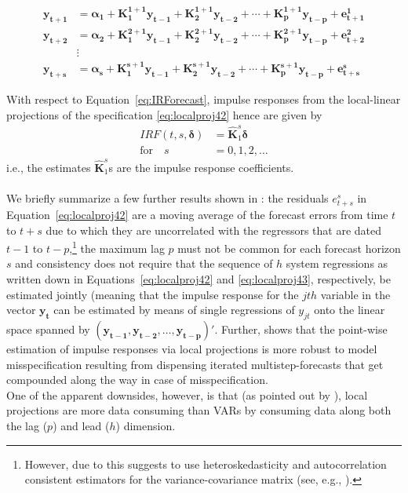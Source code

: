 \documentclass[a4paper,11pt,listof=nochaptergap,oneside,pointednumbers,bibtotoc,bigheadings,liststotoc]{scrbook}
\theoremstyle{mysatz}
\theoremstyle{mydefinition}
\theoremstyle{mybemerkung}
\let\oldhat\hat
\newcommand{\vect}[1]{\boldsymbol{\mathbf{#1}}}
\newcommand{\hatt}[1]{\oldhat{\boldsymbol{\mathbf{#1}}}}
\begin{document}
\begin{equation} \label{eq:localproj43}
\begin{split}
	\vect{y_{t+1}} & = \vect{\alpha_1} + \vect{K_1^{1+1}}\vect{y_{t-1}} + \vect{K_2^{1+1}}\vect{y_{t-2}} + \cdots + \vect{K_p^{1+1}}\vect{y_{t-p}} + \vect{e_{t+1}^1} \\
	\vect{y_{t+2}} & = \vect{\alpha_2} + \vect{K_1^{2+1}}\vect{y_{t-1}} + \vect{K_2^{2+1}}\vect{y_{t-2}} + \cdots + \vect{K_p^{2+1}}\vect{y_{t-p}} + \vect{e_{t+2}^2} \\
	& \vdots \\
	\vect{y_{t+s}} & = \vect{\alpha_s} + \vect{K_1^{s+1}}\vect{y_{t-1}} + \vect{K_2^{s+1}}\vect{y_{t-2}} + \cdots + \vect{K_p^{s+1}}\vect{y_{t-p}} + \vect{e_{t+s}^s}
\end{split}								
\end{equation}

With respect to Equation~\ref{eq:IRForecast}, impulse responses from the local-linear projections of the specification \ref{eq:localproj42} hence are given by
\begin{equation}\label{eq:IRFLocProjDefinition}
\begin{split}
	IRF(t, s, \vect{\delta}) & = {\hatt{K}_1^s}\vect{\delta}  \\
	\text{for} \quad s & = 0, 1, 2, \dots
\end{split}
\end{equation}
i.e., the estimates ${\hatt{K}_1^s}$s are the impulse response coefficients.\\
\\
We briefly summarize a few further results shown in \citet{jorda:05}: the residuals $e_{t+s}^s$ in Equation~\ref{eq:localproj42} are a moving average of the forecast errors from time $t$ to $t+s$ due to which they are uncorrelated with the regressors that are dated $t-1$ to $t-p$,\footnote{However, due to this \citet{jorda:05} suggests to use heteroskedasticity and autocorrelation consistent estimators for the variance-covariance matrix (see, e.g., \citealp{newest:87}).} the maximum lag $p$ must not be common for each forecast horizon $s$ and consistency does not require that the sequence of $h$ system regressions as written down in Equations~\ref{eq:localproj42} and \ref{eq:localproj43}, respectively, be estimated jointly (meaning that the impulse response for the $jth$ variable in the vector $\vect{y_t}$ can be estimated by means of single regressions of $y_{jt}$ onto the linear space spanned by $(\vect{y_{t-1}}, \vect{y_{t-2}}, \dots, \vect{y_{t-p}})'$. Further, \citet{jorda:05} shows that the point-wise estimation of impulse responses via local projections is more robust to model misspecification resulting from dispensing iterated multistep-forecasts that get compounded along the way in case of misspecification.\\
One of the apparent downsides, however, is that (as pointed out by \citealp{brugnolini:18}), local projections are more data consuming than VARs by consuming data along both the lag ($p$) and lead ($h$) dimension.
\end{document}

